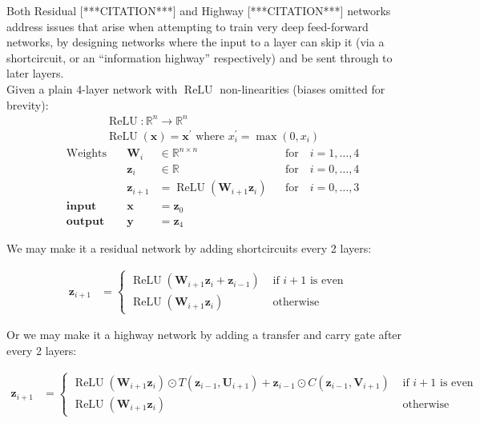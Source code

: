 Both Residual [***CITATION***] and Highway [***CITATION***] networks address issues that arise when attempting to train very deep feed-forward networks, by designing networks where the input to a layer can skip it (via a shortcircuit, or an ``information highway'' respectively) and be sent through to later layers.\\[1em]

Given a plain 4-layer network with $\operatorname{ReLU}$ non-linearities (biases omitted for brevity):
\begin{align*}
  &\operatorname{ReLU} : \mathbb{R}^n\to\mathbb{R}^n\\
  &\operatorname{ReLU}(\mathbf{x}) = \mathbf{x}^\prime\text{ where }x^\prime_i = \max(0,x_i)
\end{align*}
\begin{align*}
  &\text{Weights}\quad&\mathbf{W}_i & \in\mathbb{R}^{n\times n} && \text{for}\quad i = 1,\ldots,4\\
  &&\mathbf{z}_i & \in\mathbb{R} &&\text{for}\quad i = 0,\ldots,4\\
  &&\mathbf{z}_{i+1} & = \operatorname{ReLU}(\mathbf{W}_{i+1}\mathbf{z}_i) &&\text{for}\quad i = 0,\ldots,3\\
  &\textbf{input}\quad&\mathbf{x} & = \mathbf{z}_0\\
  &\textbf{output}\quad&\mathbf{y} & = \mathbf{z}_4
\end{align*}

We may make it a residual network by adding shortcircuits every 2 layers:

\begin{align*}
  \mathbf{z}_{i+1} & =
  \begin{cases}
    \operatorname{ReLU}(\mathbf{W}_{i+1}\mathbf{z}_i + \mathbf{z}_{i-1})
    & \text{ if $i+1$ is even}\\
    \operatorname{ReLU}(\mathbf{W}_{i+1}\mathbf{z}_i)
    & \text{ otherwise}
  \end{cases}
\end{align*}

Or we may make it a highway network by adding a transfer and carry gate after every 2 layers:

\begin{align*}
  \mathbf{z}_{i+1} & =
  \begin{cases}
    \operatorname{ReLU}(\mathbf{W}_{i+1}\mathbf{z}_i)\odot T(\mathbf{z}_{i-1},\mathbf{U}_{i+1})
    +\mathbf{z}_{i-1}\odot C(\mathbf{z}_{i-1},\mathbf{V}_{i+1})
    & \text{ if $i+1$ is even}\\
    \operatorname{ReLU}(\mathbf{W}_{i+1}\mathbf{z}_i)
    & \text{ otherwise}
  \end{cases}
\end{align*}

